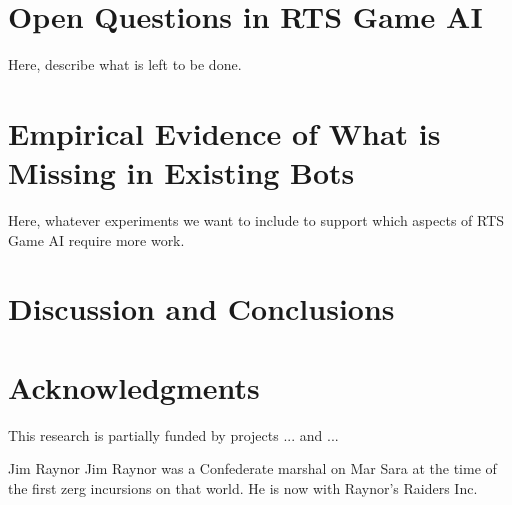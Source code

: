 \documentclass[journal]{IEEEtran}
\begin{document}
\section{Open Questions in RTS Game AI}\label{sec:questions}

{\color{blue}
Here, describe what is left to be done.
}


\section{Empirical Evidence of What is Missing in Existing Bots}\label{sec:experiments}

{\color{blue}
Here, whatever experiments we want to include to support which aspects of RTS Game AI require more work.
}

\section{Discussion and Conclusions}\label{sec:conclusions}



\section*{Acknowledgments} {\color{blue} This research is partially funded by projects ... and ... }



\ifCLASSOPTIONcaptionsoff
  \newpage
\fi

                                                    



\begin{IEEEbiography}{Jim Raynor}
Jim Raynor was a Confederate marshal on Mar Sara at the time of the first zerg incursions on that world. He is now with Raynor's Raiders Inc.
\end{IEEEbiography}
\end{document}
